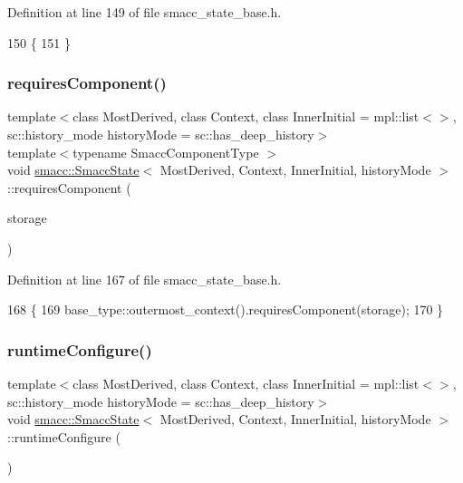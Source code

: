 Definition at line 149 of file smacc\+\_\+state\+\_\+base.\+h.


\begin{DoxyCode}
150   \{
151   \}
\end{DoxyCode}
\mbox{\label{classsmacc_1_1SmaccState_a2febb778d5c3d80b9c034576b5a92b65}} 
\subsubsection{\texorpdfstring{requires\+Component()}{requiresComponent()}}
{\footnotesize\ttfamily template$<$class Most\+Derived, class Context, class Inner\+Initial = mpl\+::list$<$$>$, sc\+::history\+\_\+mode history\+Mode = sc\+::has\+\_\+deep\+\_\+history$>$ \\
template$<$typename Smacc\+Component\+Type $>$ \\
void \hyperlink{classsmacc_1_1SmaccState}{smacc\+::\+Smacc\+State}$<$ Most\+Derived, Context, Inner\+Initial, history\+Mode $>$\+::requires\+Component (\begin{DoxyParamCaption}\item[{Smacc\+Component\+Type $\ast$\&}]{storage }\end{DoxyParamCaption})\hspace{0.3cm}{\ttfamily [inline]}}



Definition at line 167 of file smacc\+\_\+state\+\_\+base.\+h.


\begin{DoxyCode}
168   \{
169     base\_type::outermost\_context().requiresComponent(storage);
170   \}
\end{DoxyCode}
\mbox{\label{classsmacc_1_1SmaccState_a6995704a0232e24f4c38250302c0a01f}} 
\subsubsection{\texorpdfstring{runtime\+Configure()}{runtimeConfigure()}}
{\footnotesize\ttfamily template$<$class Most\+Derived, class Context, class Inner\+Initial = mpl\+::list$<$$>$, sc\+::history\+\_\+mode history\+Mode = sc\+::has\+\_\+deep\+\_\+history$>$ \\
void \hyperlink{classsmacc_1_1SmaccState}{smacc\+::\+Smacc\+State}$<$ Most\+Derived, Context, Inner\+Initial, history\+Mode $>$\+::runtime\+Configure (\begin{DoxyParamCaption}{ }\end{DoxyParamCaption})\hspace{0.3cm}{\ttfamily [inline]}}



